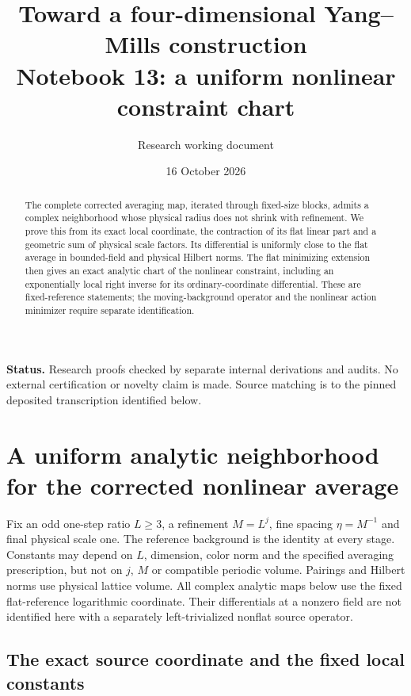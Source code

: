 \documentclass[11pt]{article}
\title{Toward a four-dimensional Yang--Mills construction\\
\large Notebook 13: a uniform nonlinear constraint chart}
\author{Research working document}
\date{16 October 2026}
\theoremstyle{remark}
\newcommand{\norm}[1]{\left\|#1\right\|}
\begin{document}
\maketitle
\begin{abstract}
The complete corrected averaging map, iterated through fixed-size
blocks, admits a complex neighborhood whose physical radius does
not shrink with refinement. We prove this from its exact local
coordinate, the contraction of its flat linear part and a geometric
sum of physical scale factors. Its differential is uniformly close
to the flat average in bounded-field and physical Hilbert norms.
The flat minimizing extension then gives an exact analytic chart
of the nonlinear constraint, including an exponentially local
right inverse for its ordinary-coordinate differential. These are
fixed-reference statements; the moving-background operator and
the nonlinear action minimizer require separate identification.
\end{abstract}
\noindent\textbf{Status.}
Research proofs checked by separate internal derivations and audits.
No external certification or novelty claim is made. Source matching
is to the pinned deposited transcription identified below.

\section{A uniform analytic neighborhood for the corrected nonlinear average}
\label{na-section}

Fix an odd one-step ratio $L\ge3$, a refinement $M=L^j$, fine
spacing $\eta=M^{-1}$ and final physical scale one. The reference
background is the identity at every stage. Constants may depend on
$L$, dimension, color norm and the specified averaging prescription,
but not on $j$, $M$ or compatible periodic volume. Pairings and
Hilbert norms use physical lattice volume. All complex analytic maps
below use the fixed flat-reference logarithmic coordinate. Their
differentials at a nonzero field are not identified here with a
separately left-trivialized nonflat source operator.

\subsection{The exact source coordinate and the fixed local constants}
\label{na-source}
\end{document}
